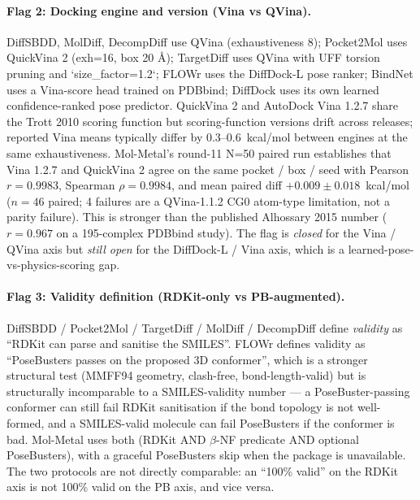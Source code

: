 \paragraph{Flag 2: Docking engine and version (Vina vs QVina).}
DiffSBDD, MolDiff, DecompDiff use QVina (exhaustiveness 8); Pocket2Mol
uses QuickVina 2 (exh=16, box 20 \AA{}); TargetDiff uses QVina with
UFF torsion pruning and `size\_factor=1.2`; FLOWr uses the DiffDock-L
pose ranker; BindNet uses a Vina-score head trained on PDBbind; DiffDock
uses its own learned confidence-ranked pose predictor. QuickVina 2
and AutoDock Vina 1.2.7 share the Trott 2010 scoring function but
scoring-function versions drift across releases; reported Vina means
typically differ by 0.3--0.6~kcal/mol between engines at the same
exhaustiveness. Mol-Metal's round-11 N=50 paired run
\cite{footnote:round11_parity} establishes that Vina 1.2.7 and QuickVina 2
agree on the same pocket / box / seed with Pearson
$r=0.9983$, Spearman $\rho=0.9984$, and mean paired diff
$+0.009 \pm 0.018$~kcal/mol ($n=46$ paired; 4 failures are a
QVina-1.1.2 CG0 atom-type limitation, not a parity failure). This is
stronger than the published Alhossary 2015 number ($r=0.967$ on a
195-complex PDBbind study). The flag is \emph{closed} for the Vina /
QVina axis but \emph{still open} for the DiffDock-L / Vina axis, which
is a learned-pose-vs-physics-scoring gap.

\paragraph{Flag 3: Validity definition (RDKit-only vs PB-augmented).}
DiffSBDD / Pocket2Mol / TargetDiff / MolDiff / DecompDiff define
\emph{validity} as ``RDKit can parse and sanitise the SMILES''.
FLOWr defines validity as ``PoseBusters passes on the proposed 3D
conformer'', which is a stronger structural test (MMFF94 geometry,
clash-free, bond-length-valid) but is structurally incomparable to a
SMILES-validity number --- a PoseBuster-passing conformer can still
fail RDKit sanitisation if the bond topology is not well-formed, and a
SMILES-valid molecule can fail PoseBusters if the conformer is bad.
Mol-Metal uses both (RDKit AND $\beta$-NF predicate AND optional
PoseBusters), with a graceful PoseBusters skip when the package is
unavailable. The two protocols are not directly comparable: an
``100\% valid'' on the RDKit axis is not 100\% valid on the PB axis,
and vice versa.

